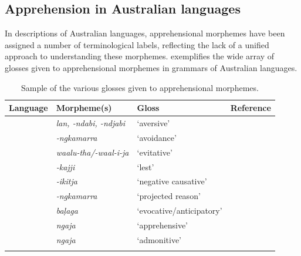 \documentclass[output=paper,colorlinks,citecolor=brown]{langscibook}
\begin{document}
\subsection{Apprehension in Australian languages}
\label{subsec:auslang}

In descriptions of Australian languages, apprehensional morphemes have been assigned a number of terminological labels, reflecting the lack of a unified approach to understanding these morphemes.  exemplifies the wide array of glosses given to apprehensional morphemes in grammars of Australian languages.



\begin{table}

\caption{Sample of the various glosses given to apprehensional morphemes.}
\label{tab1-bro}
\begin{tabularx}{\textwidth}{lQlQ}
\lsptoprule
Language & Morpheme(s)                                        & Gloss             & Reference \\
\midrule
{}          & \textit{lan, -ndabi, -ndjabi  }          & `aversive'                 & \citep[268]{patz_djabugay_1991}                  \\
\tablevspace
{}       & \textit{-ngkamarra}                      & `avoidance'                & \citep[95, 290--291]{jones_grammar_2011}                  \\
\tablevspace
{}         & \textit{waalu-tha/-waal-i-ja  }       & `evitative'                & \citep[173--175]{evans_current_1995}                  \\
\tablevspace
{}         & \textit{-kajji}                          & `lest'                     & \citep[22--23]{simpson_warumungu_1982}                  \\
\tablevspace
{}         & \textit{-ikitja}                         & `negative causative'       & \citep[69, 75--76]{yallop_alyawarra_1977}                  \\
\tablevspace
{}        & \textit{-ngkamarra}                      & `projected reason'         & \citep[31]{hudson_core_1978}                  \\
\tablevspace
{}        & \textit{ba\d{l}aga}                          & `evocative/anticipatory' & \citep[146--147]{merlan_mangarayi_1989}                  \\
\tablevspace
{}        & \textit{ngaja}                           & `apprehensive'             & \citep{angeloschultzeberndt2016}                 \\
\tablevspace
{}         & \textit{ngaja}                           & `admonitive'               & \citep[305]{meakins_grammar_2014}\\
\lspbottomrule
\end{tabularx}
\end{table}
\end{document}
